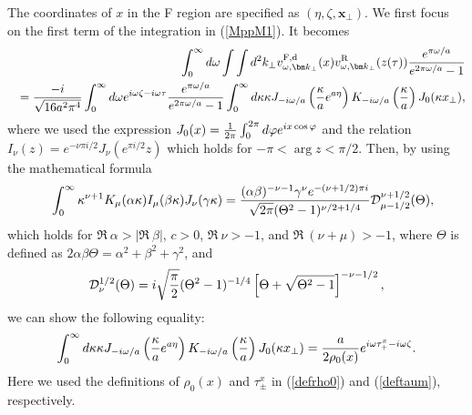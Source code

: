\documentclass[aps,prd,preprintnumbers,nofootinbib,showpacs]{revtex4}%
\begin{document}
\begin{widetext}
The coordinates of $x$ in the F region are specified as $(\eta,\zeta,\bm x_\perp)$.
We first focus on the first term of the integration in (\ref{MppM1}). It becomes
\begin{eqnarray}
&&\int_0^{\infty}d\omega\int\int d^2k_\perp
v_{\omega,\bm k_\perp}^{\rm F,d}(x)v_{\omega,\bm k_\perp}^{\rm R}(z(\tau))
{e^{\pi\omega/a}\over e^{2\pi\omega/a}-1}
\nonumber\\
&&={-i\over \sqrt{16 a^2\pi^4}}\int_0^{\infty}d\omega e^{i\omega\zeta-i\omega\tau}
{e^{\pi\omega/a}\over e^{2\pi\omega/a}-1} \int_0^\infty d\kappa \kappa 
J_{-i\omega/a}\left({\kappa\over a}e^{a\eta}\right)
K_{-i\omega/a}\left({\kappa\over a}\right) J_0(\kappa x_\perp),
\label{firsttermMppM}
\end{eqnarray}
where we used the expression
$J_0(x)={1\over 2\pi} \int_0^{2\pi} d\varphi e^{ix\cos\varphi}$
and the relation
$ I_\nu(z)=e^{-\nu\pi i/2}J_\nu(e^{\pi i/2}z) $ 
which holds for $-\pi<\arg z<\pi/2$. 
Then, by using the mathematical formula
\begin{eqnarray}
&&\int_0^\infty \kappa^{\nu+1}K_\mu(\alpha\kappa)I_\mu(\beta\kappa)J_\nu(\gamma\kappa)
={(\alpha\beta)^{-\nu-1}\gamma^\nu e^{-(\nu+1/2)\pi i}\over \sqrt{2\pi}(\Theta^2-1)^{\nu/2+1/4}}
{\cal D}_{\mu-1/2}^{\nu+1/2}(\Theta) ,
\end{eqnarray}
which holds for $\Re~\alpha>|\Re~\beta|$, $c>0$, $\Re~\nu>-1$, and $\Re~(\nu+\mu)>-1$, where 
$\Theta$ is defined as $2\alpha\beta\Theta=\alpha^2+\beta^2+\gamma^2$, and 
\begin{eqnarray}
{\cal D}_\nu^{1/2}(\Theta)=i\sqrt{\pi\over 2}(\Theta^2-1)^{-1/4}\left[\Theta+\sqrt{\Theta^2-1}\right]^{-\nu-1/2} ,
\end{eqnarray}
 we can show the following equality: 
\begin{eqnarray}
\int_0^\infty d\kappa \kappa J_{-i\omega/a}\left({\kappa\over a}e^{a\eta}\right)
K_{-i\omega/a}\left({\kappa\over a}\right) J_0(\kappa x_\perp)
={a\over 2\rho_0(x)}e^{i\omega\tau_+^{x}-i\omega\zeta}.
\end{eqnarray}
Here we used the definitions of $\rho_0(x)$ and $\tau_\pm^x$ in (\ref{defrho0}) and (\ref{deftaum}), respectively.




\end{widetext}
\end{document}
